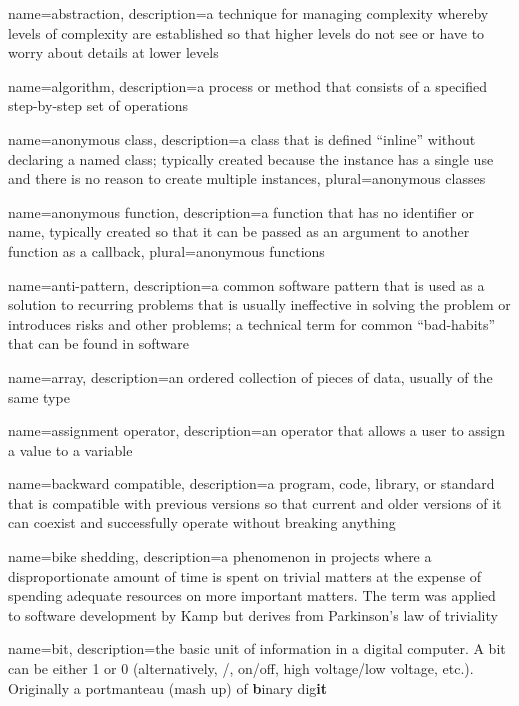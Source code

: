 
{
  name=abstraction,
  description={a technique for managing complexity whereby levels of complexity are established so that higher levels do not see or have to worry about details at lower levels}
}

{
  name=algorithm,
  description={a process or method that consists of a specified step-by-step set of operations}
}

{
  name=anonymous class,
  description={a class that is defined ``inline'' without declaring a named class; typically created because the instance has a single use and there is no reason to create multiple instances},
  plural=anonymous classes
}

{
  name=anonymous function,
  description={a function that has no identifier or name, typically created so that it can be passed as an argument to another function as a callback},
  plural=anonymous functions
}

{
  name=anti-pattern,
  description={a common software pattern that is used as a solution to recurring problems that is usually ineffective in solving the problem or introduces risks and other problems; a technical term for common ``bad-habits'' that can be found in software}
}

{
  name=array,
  description={an ordered collection of pieces of data, usually of the same type}
}

{
  name=assignment operator,
  description={an operator that allows a user to assign a value to a variable}
}

{
  name=backward compatible,
  description={a program, code, library, or standard that is compatible with previous versions so that current
  	and older versions of it can coexist and successfully operate without breaking anything}
}

{
  name=bike shedding,
  description={a phenomenon in projects where a disproportionate amount of time is spent on trivial matters at the expense of spending adequate resources on more important matters.  The term was applied to software development by Kamp \cite{bikeShed99} but derives from Parkinson's law of triviality \cite{Parkinson58}}
}

{
  name=bit,
  description={the basic unit of information in a digital computer.  A bit can be either 1 or 0 (alternatively, \True/\False, 
  	on/off, high voltage/low voltage, etc.).  Originally a portmanteau (mash up) of \textbf{b}inary dig\textbf{it}}
}

